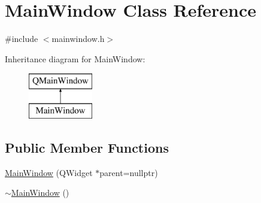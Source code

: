 \hypertarget{class_main_window}{}\section{Main\+Window Class Reference}
\label{class_main_window}


{\ttfamily \#include $<$mainwindow.\+h$>$}

Inheritance diagram for Main\+Window\+:\begin{figure}[H]
\begin{center}
\leavevmode
\includegraphics[height=2.000000cm]{class_main_window}
\end{center}
\end{figure}
\subsection*{Public Member Functions}
\begin{DoxyCompactItemize}
\item 
\mbox{\hyperlink{class_main_window_a996c5a2b6f77944776856f08ec30858d}{Main\+Window}} (Q\+Widget $\ast$parent=nullptr)
\item 
\mbox{\hyperlink{class_main_window_ae98d00a93bc118200eeef9f9bba1dba7}{$\sim$\+Main\+Window}} ()
\end{DoxyCompactItemize}
